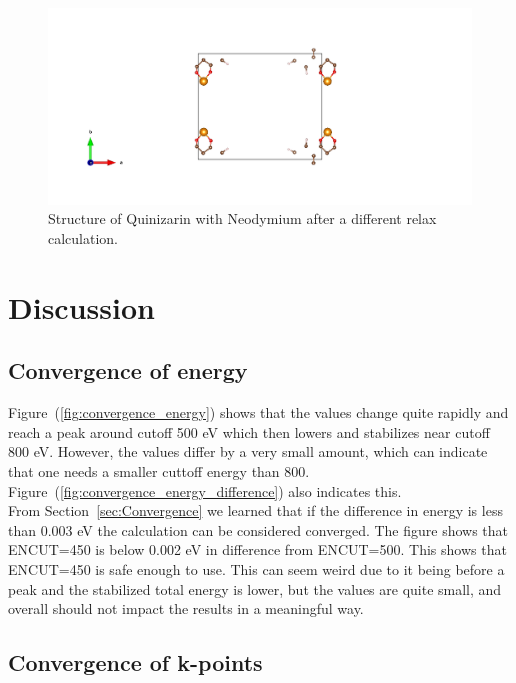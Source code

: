 \documentclass{article}
\begin{document}
      \begin{figure}[H]
        \centering
        \includegraphics[width = \textwidth]{../fig/Nd_relax_new_CONTCAR.png}
        \caption{Structure of Quinizarin with Neodymium after a different relax calculation.}
        \label{fig:Nd_relax_new_CONTCAR}
      \end{figure}

\vspace{1cm}

\section{Discussion}    \label{sec:Discussion}

  \subsection{Convergence of energy}

    Figure~(\ref{fig:convergence_energy}) shows that the values change quite rapidly and reach a peak around cutoff 500 eV which then lowers and stabilizes near cutoff 800 eV. However, the values differ by a very small amount, which can indicate that one needs a smaller cuttoff energy than 800. Figure~(\ref{fig:convergence_energy_difference}) also indicates this. \\

    From Section~\ref{sec:Convergence} we learned that if the difference in energy is less than 0.003 eV the calculation can be considered converged. The figure shows that ENCUT=450 is below 0.002 eV in difference from ENCUT=500. This shows that ENCUT=450 is safe enough to use. This can seem weird due to it being before a peak and the stabilized total energy is lower, but the values are quite small, and overall should not impact the results in a meaningful way. \\

  \subsection{Convergence of k-points}
\end{document}
